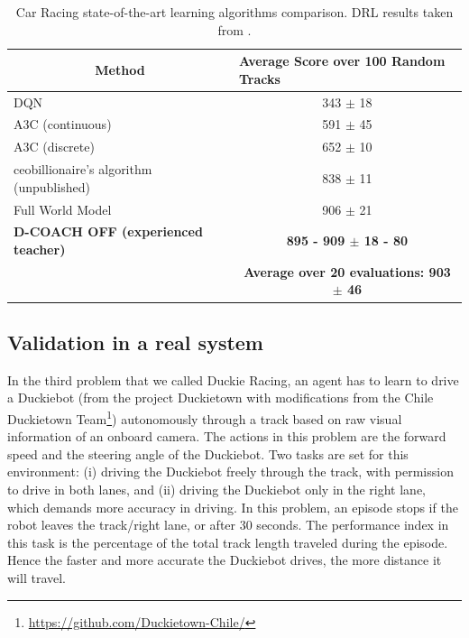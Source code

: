 \begin{table}[t]
\centering
\caption{Car Racing state-of-the-art learning algorithms comparison. DRL results taken from \cite{Ha2018}.}
\label{CarRacing_table}
\begin{tabular}{lc}
\multicolumn{1}{c}{\textbf{Method}}      & \multicolumn{1}{l}{\textbf{Average Score over 100 Random Tracks}} \\ \hline\hline
DQN                                      & 343 $\pm$ 18                                                      \\ \hline
A3C (continuous)                         & 591 $\pm$ 45                                                      \\ \hline
A3C (discrete)                           & 652 $\pm$ 10                                                      \\ \hline
ceobillionaire’s algorithm (unpublished) & 838 $\pm$ 11                                                      \\ \hline
Full World Model                         & 906 $\pm$ 21                                                      \\ \hline
\textbf{D-COACH OFF (experienced teacher)}                         & \textbf{895 - 909 $\pm$ 18 - 80} \\
& \textbf{Average over 20 evaluations: 903 $\pm$ 46}
\\ \hline
\end{tabular}
\end{table}

\subsection{Validation in a real system}
In the third problem that we called Duckie Racing, an agent has to learn to drive a Duckiebot (from the project  Duckietown \cite{Paull2017} with modifications from the Chile Duckietown Team\footnote{\url{https://github.com/Duckietown-Chile/}}) autonomously through a track based on raw visual information of an onboard camera. The actions in this problem are the forward speed and the steering angle of the Duckiebot. Two tasks are set for this environment: (i) driving the Duckiebot freely through the track, with permission to drive in both lanes, and (ii) driving the Duckiebot only in the right lane, which demands more accuracy in driving. In this problem, an episode stops if the robot leaves the track/right lane, or after 30 seconds. The performance index in this task is the percentage of the total track length traveled during the episode. Hence the faster and more accurate the Duckiebot drives, the more distance it will travel.

